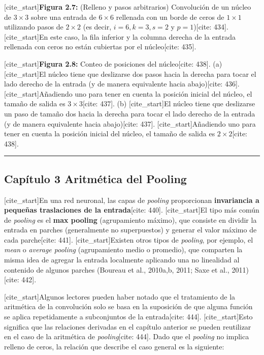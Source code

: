\documentclass[
  super,
  preprint,
  3p]{elsarticle}
\begin{document}
{[}cite\_start{]}\textbf{Figura 2.7:} (Relleno y pasos arbitrarios)
Convolución de un núcleo de \(3 \times 3\) sobre una entrada de
\(6 \times 6\) rellenada con un borde de ceros de \(1 \times 1\)
utilizando pasos de \(2 \times 2\) (es decir, \(i = 6, k = 3, s = 2\) y
\(p = 1\)){[}cite: 434{]}. {[}cite\_start{]}En este caso, la fila
inferior y la columna derecha de la entrada rellenada con ceros no están
cubiertas por el núcleo{[}cite: 435{]}.

{[}cite\_start{]}\textbf{Figura 2.8:} Conteo de posiciones del
núcleo{[}cite: 438{]}. (a) {[}cite\_start{]}El núcleo tiene que
deslizarse dos pasos hacia la derecha para tocar el lado derecho de la
entrada (y de manera equivalente hacia abajo){[}cite: 436{]}.
{[}cite\_start{]}Añadiendo uno para tener en cuenta la posición inicial
del núcleo, el tamaño de salida es \(3 \times 3\){[}cite: 437{]}. (b)
{[}cite\_start{]}El núcleo tiene que deslizarse un paso de tamaño dos
hacia la derecha para tocar el lado derecho de la entrada (y de manera
equivalente hacia abajo){[}cite: 437{]}. {[}cite\_start{]}Añadiendo uno
para tener en cuenta la posición inicial del núcleo, el tamaño de salida
es \(2 \times 2\){[}cite: 438{]}.

\begin{center}\rule{0.5\linewidth}{0.5pt}\end{center}

\subsection{Capítulo 3 Aritmética del
Pooling}\label{capuxedtulo-3-aritmuxe9tica-del-pooling}

{[}cite\_start{]}En una red neuronal, las capas de \emph{pooling}
proporcionan \textbf{invariancia a pequeñas traslaciones de la
entrada}{[}cite: 440{]}. {[}cite\_start{]}El tipo más común de
\emph{pooling} es el \textbf{max pooling} (agrupamiento máximo), que
consiste en dividir la entrada en parches (generalmente no superpuestos)
y generar el valor máximo de cada parche{[}cite: 441{]}.
{[}cite\_start{]}Existen otros tipos de \emph{pooling}, por ejemplo, el
\emph{mean} o \emph{average pooling} (agrupamiento medio o promedio),
que comparten la misma idea de agregar la entrada localmente aplicando
una no linealidad al contenido de algunos parches (Boureau et al.,
2010a,b, 2011; Saxe et al., 2011){[}cite: 442{]}.

{[}cite\_start{]}Algunos lectores pueden haber notado que el tratamiento
de la aritmética de la convolución solo se basa en la suposición de que
alguna función se aplica repetidamente a subconjuntos de la
entrada{[}cite: 444{]}. {[}cite\_start{]}Esto significa que las
relaciones derivadas en el capítulo anterior se pueden reutilizar en el
caso de la aritmética de \emph{pooling}{[}cite: 444{]}. Dado que el
\emph{pooling} no implica relleno de ceros, la relación que describe el
caso general es la siguiente:
\end{document}
